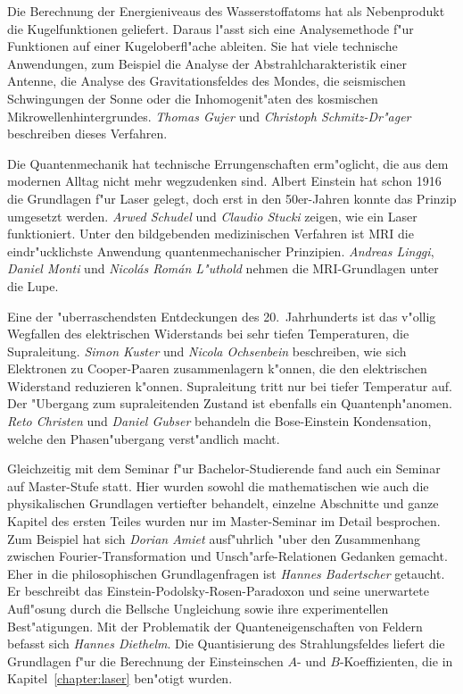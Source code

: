 Die Berechnung der Energieniveaus des Wasserstoffatoms hat als
Nebenprodukt die Kugelfunktionen geliefert.
Daraus l"asst sich eine Analysemethode f"ur Funktionen auf einer
Kugeloberfl"ache ableiten.
Sie hat viele technische Anwendungen, zum Beispiel die Analyse der
Abstrahlcharakteristik einer Antenne, die Analyse des Gravitationsfeldes des
Mondes, die seismischen Schwingungen der Sonne oder die Inhomogenit"aten des
kosmischen Mikrowellenhintergrundes.
{\em Thomas Gujer} und {\em Christoph Schmitz-Dr"ager} beschreiben
dieses Verfahren.

Die Quantenmechanik hat technische Errungenschaften erm"oglicht, die
aus dem modernen Alltag nicht mehr wegzudenken sind.
Albert Einstein hat schon 1916 die Grundlagen f"ur Laser gelegt,
doch erst in den 50er-Jahren konnte das Prinzip umgesetzt werden.
{\em Arwed Schudel} und {\em Claudio Stucki} zeigen, wie ein Laser funktioniert.
Unter den bildgebenden medizinischen Verfahren ist MRI die eindr"ucklichste
Anwendung quantenmechanischer Prinzipien.
{\em Andreas Linggi}, {\em Daniel Monti} und {\em Nicol\'as Rom\'an L"uthold}
nehmen die MRI-Grundlagen unter die Lupe.

Eine der "uberraschendsten Entdeckungen des 20.~Jahrhunderts ist das
v"ollig Wegfallen des elektrischen Widerstands bei sehr tiefen 
Temperaturen, die Supraleitung.
{\em Simon Kuster} und {\em Nicola Ochsenbein} beschreiben, wie sich
Elektronen zu Cooper-Paaren zusammenlagern k"onnen, die
den elektrischen Widerstand reduzieren k"onnen.
Supraleitung tritt nur bei tiefer Temperatur auf.
Der "Ubergang zum supraleitenden Zustand ist ebenfalls ein Quantenph"anomen.
{\em Reto Christen} und {\em Daniel Gubser} behandeln die Bose-Einstein
Kondensation, welche den Phasen"ubergang verst"andlich macht.

Gleichzeitig mit dem Seminar f"ur Bachelor-Studierende fand auch ein
Seminar auf Master-Stufe statt.
Hier wurden sowohl die mathematischen wie auch die physikalischen Grundlagen
vertiefter behandelt, einzelne Abschnitte und ganze Kapitel des ersten
Teiles wurden nur im Master-Seminar im Detail besprochen.
Zum Beispiel hat sich {\em Dorian Amiet} ausf"uhrlich
"uber den Zusammenhang zwischen Fourier-Transformation und 
Unsch"arfe-Relationen Gedanken gemacht.
Eher in die philosophischen Grundlagenfragen ist {\em Hannes Badertscher}
getaucht. Er beschreibt das Einstein-Podolsky-Rosen-Paradoxon und seine
unerwartete Aufl"osung durch die Bellsche Ungleichung sowie ihre experimentellen
Best"atigungen.
Mit der Problematik der Quanteneigenschaften von Feldern befasst sich
{\em Hannes Diethelm}. 
Die Quantisierung des Strahlungsfeldes liefert die Grundlagen f"ur die
Berechnung der Einsteinschen $A$- und $B$-Koeffizienten, die in 
Kapitel~\ref{chapter:laser} ben"otigt wurden.

